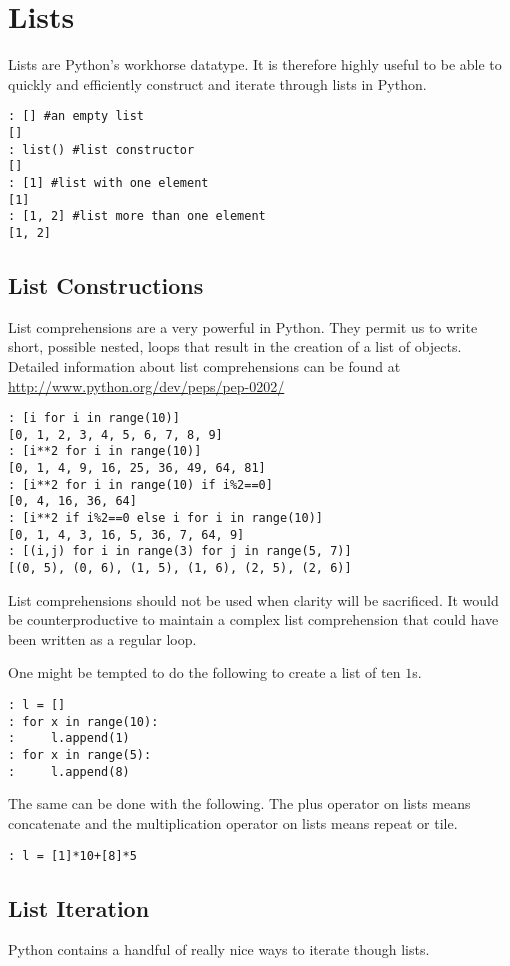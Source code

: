 \section*{Lists}
Lists are Python's workhorse datatype.  It is therefore highly useful to be able to quickly and efficiently construct and iterate through lists in Python.
\begin{lstlisting}
: [] #an empty list
[]
: list() #list constructor
[]
: [1] #list with one element
[1]
: [1, 2] #list more than one element
[1, 2]
\end{lstlisting}

\subsection*{List Constructions}
List comprehensions are a very powerful in Python.  They permit us to write short, possible nested, loops that result in the creation of a list of objects.  Detailed information about list comprehensions can be found at \url{http://www.python.org/dev/peps/pep-0202/}
\begin{lstlisting}
: [i for i in range(10)]
[0, 1, 2, 3, 4, 5, 6, 7, 8, 9]
: [i**2 for i in range(10)]
[0, 1, 4, 9, 16, 25, 36, 49, 64, 81]
: [i**2 for i in range(10) if i%2==0]
[0, 4, 16, 36, 64]
: [i**2 if i%2==0 else i for i in range(10)]
[0, 1, 4, 3, 16, 5, 36, 7, 64, 9]
: [(i,j) for i in range(3) for j in range(5, 7)]
[(0, 5), (0, 6), (1, 5), (1, 6), (2, 5), (2, 6)]
\end{lstlisting}
List comprehensions should not be used when clarity will be sacrificed.  It would be counterproductive to maintain a complex list comprehension that could have been written as a regular  loop.

One might be tempted to do the following to create a list of ten $1$s.
\begin{lstlisting}
: l = []
: for x in range(10):
:     l.append(1)
: for x in range(5):
:     l.append(8)
\end{lstlisting}
The same can be done with the following.  The plus operator on lists means concatenate and the
multiplication operator on lists means repeat or tile.
\begin{lstlisting}
: l = [1]*10+[8]*5
\end{lstlisting}

\subsection*{List Iteration}
Python contains a handful of really nice ways to iterate though lists.

